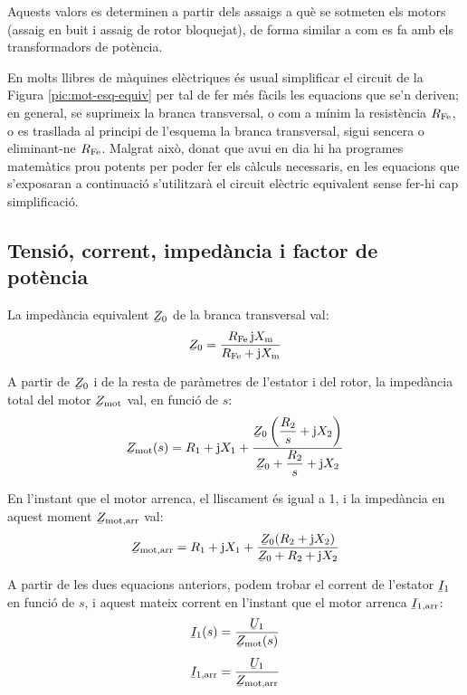 Aquests valors es determinen a partir dels assaigs a què se sotmeten els motors (assaig en buit i assaig de rotor bloquejat), de forma similar a com es fa amb els transformadors de potència.

En molts llibres de màquines elèctriques és usual simplificar el circuit de la Figura  \vref{pic:mot-esq-equiv} per tal de fer més fàcils les equacions que se'n deriven; en general, se suprimeix la branca transversal, o com a mínim la resistència $R_\mathrm{Fe}$, o es trasllada al principi de l'esquema la branca transversal, sigui sencera o eliminant-ne  $R_\mathrm{Fe}$. Malgrat això, donat que avui en dia hi ha programes matemàtics prou potents per poder fer els càlculs necessaris, en les equacions que s'exposaran a continuació s'utilitzarà el circuit elèctric equivalent sense fer-hi cap simplificació.

\subsection{Tensió, corrent, impedància i factor de potència}\label{sec:mot-u-c-i}

La impedància equivalent $\cmplx{Z}_0$ de la branca transversal val:
\begin{equation}\label{eq:mot-Z0}
    \cmplx{Z}_0 = \frac{R\ped{Fe} \, \ju X\ped{m}}{ R\ped{Fe} + \ju X\ped{m}}
\end{equation}

A partir de $\cmplx{Z}_0$ i de la resta de paràmetres de l'estator i del rotor, la impedància total del motor $\cmplx{Z}\ped{mot}$ val,  en funció de $s$:
\begin{equation}\label{eq:mot-Zmot}\index{motors d'inducció!impedància}
    \cmplx{Z}\ped{mot}(s) = R_1 + \ju X_1 + \frac{\cmplx{Z}_0 \left( \dfrac{R_2}{s} + \ju X_2\right)}{\cmplx{Z}_0 +  \dfrac{R_2}{s} + \ju X_2}
\end{equation}

En l'instant que el motor arrenca, el lliscament és igual a 1, i la impedància en aquest moment $\cmplx{Z}\ped{mot,arr}$ val:
\begin{equation}\label{eq:z-mot-arr}
    \cmplx{Z}\ped{mot,arr} = R_1 + \ju X_1 + \frac{\cmplx{Z}_0 ( R_2 + \ju X_2)}{\cmplx{Z}_0 +  R_2 + \ju X_2}
\end{equation}

A partir de les dues equacions anteriors, podem trobar el corrent de l'estator  $\cmplx{I}_1$ en funció de $s$, i aquest mateix corrent en l'instant que el motor arrenca $\cmplx{I}\ped{1,arr}$:
\begin{subequations}\index{motors d'inducció!corrent d'arrencada}\index{motors d'inducció!corrent}
\begin{align}
    \cmplx{I}_1(s) &= \frac{\cmplx{U}_1}{\cmplx{Z}\ped{mot}(s)}\label{eq:I1-mot} \\[1ex]
    \cmplx{I}\ped{1,arr} &= \frac{\cmplx{U}_1}{\cmplx{Z}\ped{mot,arr}}\label{eq:I1-mot-arr}
\end{align}
\end{subequations}

